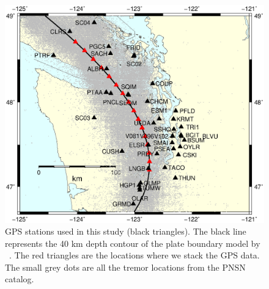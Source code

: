\documentclass{article}
\begin{document}
\begin{figure}
\noindent\includegraphics[width=\textwidth, trim={0cm 0cm 0cm 0cm},clip]{figures/map_GPS_stations.eps}
\caption{GPS stations used in this study (black triangles). The black line represents the 40 km depth contour of the plate boundary model by ~\citet{PRE_2003}. The red triangles are the locations where we stack the GPS data. The small grey dots are all the tremor locations from the PNSN catalog.}
\label{pngfiguresample}
\end{figure}
\end{document}
